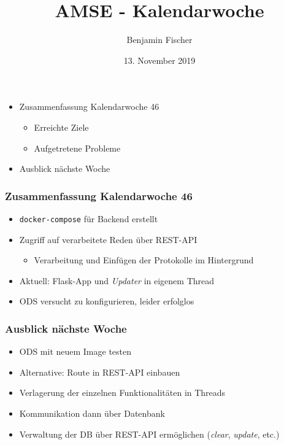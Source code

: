 \documentclass{beamer}
\title{AMSE - Kalendarwoche \cw{}}
\date{13. November 2019}
\author{Benjamin Fischer}
\institute{benjamin.f.fischer@fau.de}
\newcommand{\cw}{46}
\begin{document}
  \maketitle

  \begin{frame}
    \begin{itemize}
      \item Zusammenfassung Kalendarwoche \cw{}
      \begin{itemize}
        \item Erreichte Ziele
        \item Aufgetretene Probleme
      \end{itemize}
      \item Ausblick nächste Woche
    \end{itemize}
  \end{frame}

  \begin{frame}
    \frametitle{Zusammenfassung Kalendarwoche \cw{}}
    \begin{itemize}
      \item \texttt{docker-compose} für Backend erstellt
      \item Zugriff auf verarbeitete Reden über REST-API
      \begin{itemize}
        \item Verarbeitung und Einfügen der Protokolle im Hintergrund
      \end{itemize}
      \item Aktuell: Flask-App und \textit{Updater} in eigenem Thread
      \item ODS versucht zu konfigurieren, leider erfolglos
    \end{itemize}
  \end{frame}

  \begin{frame}
    \frametitle{Ausblick nächste Woche}
    \begin{itemize}
      \item ODS mit neuem Image testen
      \item Alternative: Route in REST-API einbauen
      \item Verlagerung der einzelnen Funktionalitäten in Threads
      \item Kommunikation dann über Datenbank
      \item Verwaltung der DB über REST-API ermöglichen 
              (\textit{clear}, \textit{update}, etc.)
    \end{itemize}
  \end{frame}
\end{document}
